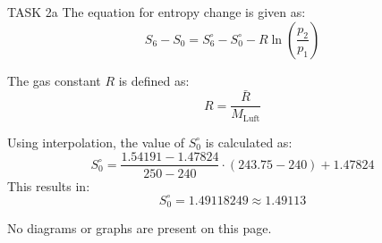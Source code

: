 TASK 2a  
The equation for entropy change is given as:  
\[
S_6 - S_0 = S^\circ_6 - S^\circ_0 - R \ln \left( \frac{p_2}{p_1} \right)
\]  

The gas constant \( R \) is defined as:  
\[
R = \frac{\bar{R}}{M_{\text{Luft}}}
\]  

Using interpolation, the value of \( S^\circ_0 \) is calculated as:  
\[
S^\circ_0 = \frac{1.54191 - 1.47824}{250 - 240} \cdot (243.75 - 240) + 1.47824
\]  
This results in:  
\[
S^\circ_0 = 1.49118249 \approx 1.49113
\]  

No diagrams or graphs are present on this page.